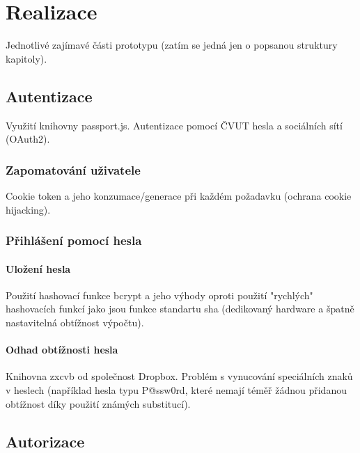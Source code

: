
\chapter{Realizace}\label{ch:realizace}

Jednotlivé zajímavé části prototypu (zatím se jedná jen o popsanou struktury kapitoly).

\section{Autentizace}

Využití knihovny passport.js.
Autentizace pomocí ČVUT hesla a sociálních sítí (OAuth2).

\subsection{Zapomatování uživatele}

Cookie token a jeho konzumace/generace při každém požadavku (ochrana cookie hijacking).

\subsection{Přihlášení pomocí hesla}

\subsubsection{Uložení hesla}

Použití hashovací funkce bcrypt a jeho výhody oproti použití "rychlých" hashovacích funkcí jako jsou funkce standartu sha (dedikovaný hardware a špatně nastavitelná obtížnost výpočtu).

\subsubsection{Odhad obtížnosti hesla}

Knihovna zxcvb od společnost Dropbox.
Problém s vynucování speciálních znaků v heslech (například hesla typu P@ssw0rd, které nemají téměř žádnou přidanou obtížnost díky použití známých substitucí).

\section{Autorizace}

